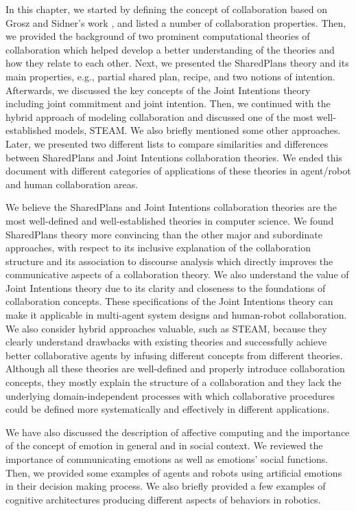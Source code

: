 \documentclass[12pt]{report}
\begin{document}
In this chapter, we started by defining the concept of collaboration based
on Grosz and Sidner's work \cite{grosz:plans-discourse}, and listed a number of
collaboration properties. Then, we provided the background of two prominent
computational theories of collaboration which helped develop a better
understanding of the theories and how they relate to each other. Next, we
presented the SharedPlans theory and its main properties, e.g., partial shared
plan, recipe, and two notions of intention. Afterwards, we discussed the key
concepts of the Joint Intentions theory including joint commitment and joint
intention. Then, we continued with the hybrid approach of modeling collaboration
and discussed one of the most well-established models, STEAM. We also briefly
mentioned some other approaches. Later, we presented two different lists to
compare similarities and differences between SharedPlans and Joint Intentions
collaboration theories. We ended this document with different categories of
applications of these theories in agent/robot and human collaboration areas.

We believe the SharedPlans and Joint Intentions collaboration theories are the
most well-defined and well-established theories in computer science. We found
SharedPlans theory more convincing than the other major and subordinate
approaches, with respect to its inclusive explanation of the collaboration
structure and its association to discourse analysis which directly improves the
communicative aspects of a collaboration theory. We also understand the value of
Joint Intentions theory due to its clarity and closeness to the foundations of
collaboration concepts. These specifications of the Joint Intentions theory can
make it applicable in multi-agent system designs and human-robot collaboration.
We also consider hybrid approaches valuable, such as STEAM, because they clearly
understand drawbacks with existing theories and successfully achieve better
collaborative agents by infusing different concepts from different theories.
Although all these theories are well-defined and properly introduce
collaboration concepts, they mostly explain the structure of a collaboration and
they lack the underlying domain-independent processes with which collaborative
procedures could be defined more systematically and effectively in different
applications.

We have also discussed the description of affective computing and the importance
of the concept of emotion in general and in social context. We reviewed the
importance of communicating emotions as well as emotions' social functions.
Then, we provided some examples of agents and robots using artificial emotions
in their decision making process. We also briefly provided a few examples of
cognitive architectures producing different aspects of behaviors in robotics.
\end{document}
